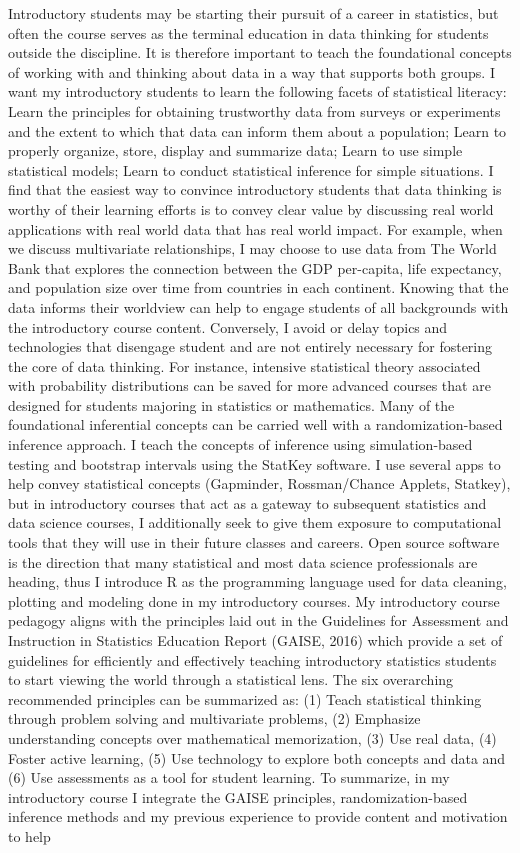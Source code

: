 \documentclass[letterpaper,12pt]{article}\usepackage[]{graphicx}\usepackage[]{color}
\begin{document}
Introductory students may be starting their pursuit of a career in statistics, but often the course serves as the terminal education in data thinking for students outside the discipline. It is therefore important to teach the foundational concepts of working with and thinking about data in a way that supports both groups. I want my introductory students to learn the following facets of statistical literacy: Learn the principles for obtaining trustworthy data from surveys or experiments and the extent to which that data can inform them about a population; Learn to properly organize, store, display and summarize data; Learn to use simple statistical models; Learn to conduct statistical inference for simple situations. I find that the easiest way to convince introductory students that data thinking is worthy of their learning efforts is to convey clear value by discussing real world applications with real world data that has real world impact. For example, when we discuss multivariate relationships, I may choose to use data from The World Bank that explores the connection between the GDP per-capita, life expectancy, and population size over time from countries in each continent. Knowing that the data informs their worldview can help to engage students of all backgrounds with the introductory course content. Conversely, I avoid or delay topics and technologies that disengage student and are not entirely necessary for fostering the core of data thinking. For instance, intensive statistical theory associated with probability distributions can be saved for more advanced courses that are designed for students majoring in statistics or mathematics. Many of the foundational inferential concepts can be carried well with a randomization-based inference approach. I teach the concepts of inference using simulation-based testing and bootstrap intervals using the StatKey software.  I use several apps to help convey statistical concepts (Gapminder, Rossman/Chance Applets, Statkey), but in introductory courses that act as a gateway to subsequent statistics and data science courses, I additionally seek to give them exposure to computational tools that they will use in their future classes and careers. Open source software is the direction that many statistical and most data science professionals are heading, thus I introduce R as the programming language used for data cleaning, plotting and modeling done in my introductory courses.  My introductory course pedagogy aligns with the principles laid out in the Guidelines for Assessment and Instruction in Statistics Education Report (GAISE, 2016) which provide a set of guidelines for efficiently and effectively teaching introductory statistics students to start viewing the world through a statistical lens. The six overarching recommended principles can be summarized as: (1) Teach statistical thinking through problem solving and multivariate problems, (2) Emphasize understanding concepts over mathematical memorization, (3) Use real data, (4) Foster active learning, (5) Use technology to explore both concepts and data and (6) Use assessments as a tool for student learning. To summarize, in my introductory course I integrate the GAISE principles, randomization-based inference methods and my previous experience to provide content and motivation to help 
\end{document}

